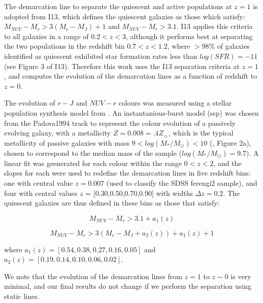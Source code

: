 \documentclass[useAMS,usenatbib]{mn2e}
\begin{document}
The demarcation line to separate the quiescent and active populations at $z=1$ is adopted from I13, which defines the quiescent galaxies as those which satisfy: $M_{NUV}-M_{r} > 3(M_{r}-M_{J})+1$ and $M_{NUV}-M_{r} > 3.1$. I13 applies this criteria to all galaxies in a range of $0.2<z<3$, although it performs best at separating the two populations in the redshift bin $0.7<z<1.2$, where $>98\%$ of galaxies identified as quiescent exhibited star formation rates less than $log(SFR) = -11$ (see Figure 3 of I13). Therefore this work uses the I13 separation criteria at $z=1$, and computes the evolution of the demarcation lines as a function of redshift to $z=0$. 

The evolution of $r-J$ and $NUV-r$ colours was measured using a stellar population synthesis model from \citet{Bruzual2003}. An instantanious-burst model (ssp) was chosen from the Padova1994 track to represent the colour evolution of a passively evolving galaxy, with a metallicity $Z=0.008=.4Z_{\sun}$, which is the typical metallicity of passive galaxies with mass $9 < log(M_{*}/M_{\odot}) < 10$ (\citet{Peng2015}, Figure 2a), chosen to correspond to the median mass of the sample ($log(M_{*}/M_{\odot})=9.7)$. A linear fit was geenerated for each colour within the range $0<z<2$, and the slopes for each were used to redefine the demarcation lines in five redshift bins: one with central value $z=0.007$ (used to classify the SDSS ferengi2 sample), and four with central values $z$ = [0.30,0.50,0.70,0.90] with widths $\Delta z=0.2$. The quiescent galaxies are thus defined in these bins as those that satisfy:

\begin{equation}
M_{NUV}-M_{r} > 3.1 + a_{1}(z)
\end{equation}

\begin{equation}
M_{NUV}-M_{r} > 3(M_{r}-M_{J} + a_{2}(z))+ a_{1}(z) + 1  
\end{equation}

where $a_{1}(z) = [0.54,0.38,0.27,0.16,0.05]$ and $a_{2}(z) = [0.19,0.14,0.10,0.06,0.02]$. 

We note that the evolution of the demarcation lines from $z=1$ to $z\sim0$ is very minimal, and our final results do not change if we perform the separation using static lines.
\end{document}
